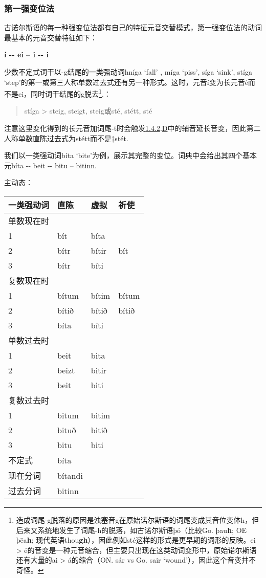 \subsubsection{第一强变位法}\label{ux7b2cux4e00ux5f3aux53d8ux4f4dux6cd5}

古诺尔斯语的每一种强变位法都有自己的特征元音交替模式，第一强变位法的动词最基本的元音交替特征如下：

\textbf{í -\/- ei -- i -\/- i}

少数不定式词干以-g结尾的一类强动词hníga `fall' , míga `piss', síga
`sink', stíga
`step'的第一或第三人称单数过去式还有另一种形式。这时，元音í变为长元音é而不是ei，同时词干结尾的g脱去\footnote{造成词尾-g脱落的原因是浊塞音g在原始诺尔斯语的词尾变成其音位变体h，但后来又系统地发生了词尾-h的脱落，如古诺尔斯语þó（比较Go.
  þau\textbf{h}; OE þēa\textbf{h};
  现代英语thou\textbf{gh}），因此例如sté这样的形式是更早期的词形的反映。ei
  \textgreater{}
  é的音变是一种元音缩合，但主要只出现在这类动词变形中，原始诺尔斯语还有大量的ai
  \textgreater{} á的缩合（ON. sár vs Go. sair
  `wound'），因此这个音变并不奇怪。}.：

\begin{quote}
stíga \textgreater{} steig, steigt, steig或sté, stétt, sté
\end{quote}

注意这里变化得到的长元音加词尾-t时会触发\hyperref[ux8f85ux97f3ux7684ux97f3ux53d8]{1.4.2}.\hyperref[_Ref116211616]{D}中的辅音延长音变，因此第二人称单数直陈过去式为stétt而不是†stét.

我们以一类强动词bíta
`bite'为例，展示其完整的变位。词典中会给出其四个基本元bíta -\/- beit
-\/- bitu -- bitinn.

主动态：

\begin{longtable}{llll}
\toprule
一类强动词 & 直陈 & 虚拟 & 祈使 \\
\midrule
\endhead
\bottomrule
\endfoot
单数现在时 & & & \\
1 & bít & bíta & \\
2 & bítr & bítir & bít \\
3 & bítr & bíti & \\
复数现在时 & & & \\
1 & bítum & bítim & bítum \\
2 & bítið & bítið & bítið \\
3 & bíta & bíti & \\
单数过去时 & & & \\
1 & beit & bita & \\
2 & beizt & bitir & \\
3 & beit & biti & \\
复数过去时 & & & \\
1 & bitum & bitim & \\
2 & bituð & bitið & \\
3 & bitu & biti & \\
不定式 & bíta & & \\
现在分词 & bítandi & & \\
过去分词 & bitinn & & \\
\end{longtable}

